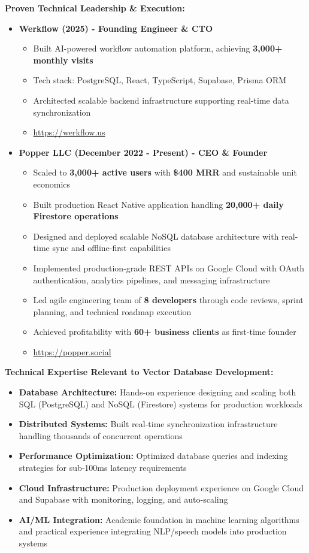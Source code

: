 \textbf{Proven Technical Leadership \& Execution:}
\begin{itemize}[noitemsep]
    \item \textbf{Werkflow (2025) - Founding Engineer \& CTO}
    \begin{itemize}[noitemsep]
        \item Built AI-powered workflow automation platform, achieving \textbf{3,000+ monthly visits}
        \item Tech stack: PostgreSQL, React, TypeScript, Supabase, Prisma ORM
        \item Architected scalable backend infrastructure supporting real-time data synchronization
        \item \url{https://werkflow.us}
    \end{itemize}
    \item \textbf{Popper LLC (December 2022 - Present) - CEO \& Founder}
    \begin{itemize}[noitemsep]
        \item Scaled to \textbf{3,000+ active users} with \textbf{\$400 MRR} and sustainable unit economics
        \item Built production React Native application handling \textbf{20,000+ daily Firestore operations}
        \item Designed and deployed scalable NoSQL database architecture with real-time sync and offline-first capabilities
        \item Implemented production-grade REST APIs on Google Cloud with OAuth authentication, analytics pipelines, and messaging infrastructure
        \item Led agile engineering team of \textbf{8 developers} through code reviews, sprint planning, and technical roadmap execution
        \item Achieved profitability with \textbf{60+ business clients} as first-time founder
        \item \url{https://popper.social}
    \end{itemize}
\end{itemize}

\textbf{Technical Expertise Relevant to Vector Database Development:}
\begin{itemize}[noitemsep]
    \item \textbf{Database Architecture:} Hands-on experience designing and scaling both SQL (PostgreSQL) and NoSQL (Firestore) systems for production workloads
    \item \textbf{Distributed Systems:} Built real-time synchronization infrastructure handling thousands of concurrent operations
    \item \textbf{Performance Optimization:} Optimized database queries and indexing strategies for sub-100ms latency requirements
    \item \textbf{Cloud Infrastructure:} Production deployment experience on Google Cloud and Supabase with monitoring, logging, and auto-scaling
    \item \textbf{AI/ML Integration:} Academic foundation in machine learning algorithms and practical experience integrating NLP/speech models into production systems
\end{itemize}

